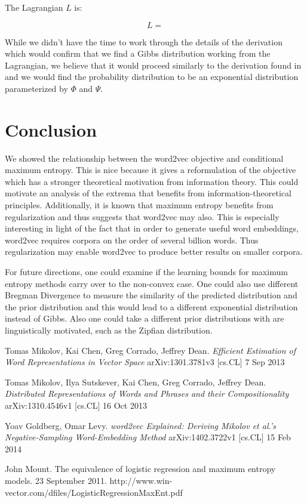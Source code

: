 \documentclass[]{article}
\begin{document}
The Lagrangian $L$ is:

\begin{equation}
	L =  
\end{equation}

While we didn't have the time to work through the details of the derivation which would confirm that we find a Gibbs distribution working from the Lagrangian, we believe that it would proceed similarly to the derivation found in \cite{logregmaxent} and we would find the probability distribution to be an exponential distribution parameterized by $\Phi$ and $\Psi$.

\section{Conclusion}

We showed the relationship between the word2vec objective and conditional maximum entropy. This is nice because it gives a reformulation of the objective which has a stronger theoretical motivation from information theory. This could motivate an analysis of the extrema that benefits from information-theoretical principles. Additionally, it is known that maximum entropy benefits from regularization and thus suggests that word2vec may also. This is especially interesting in light of the fact that in order to generate useful word embeddings, word2vec requires corpora on the order of several billion words. Thus regularization may enable word2vec to produce better results on smaller corpora.

For future directions, one could examine if the learning bounds for maximum entropy methods carry over to the non-convex case. One could also use different Bregman Divergence to measure the similarity of the predicted distribution and the prior distribution and this would lead to a different exponential distribution instead of Gibbs. Also one could take a different prior distributions with are linguistically motivated, such as the Zipfian distribution.

\begin{thebibliography}{1}
	 Tomas Mikolov, Kai Chen, Greg Corrado, Jeffrey Dean. {\em Efficient Estimation of Word Representations in Vector Space} arXiv:1301.3781v3 [cs.CL] 7 Sep 2013
	
	 Tomas Mikolov, Ilya Sutskever, Kai Chen, Greg Corrado, Jeffrey Dean. {\em Distributed Representations of Words and Phrases and their Compositionality} arXiv:1310.4546v1  [cs.CL]  16 Oct 2013
	
	 Yoav Goldberg, Omar Levy. {\em word2vec Explained: Deriving Mikolov et al.'s Negative-Sampling Word-Embedding Method} arXiv:1402.3722v1  [cs.CL]  15 Feb 2014
	
	 John Mount. The equivalence of logistic regression and maximum entropy
	models. 23 September 2011. http://www.win-vector.com/dfiles/LogisticRegressionMaxEnt.pdf
	
\end{thebibliography}
\end{document}
